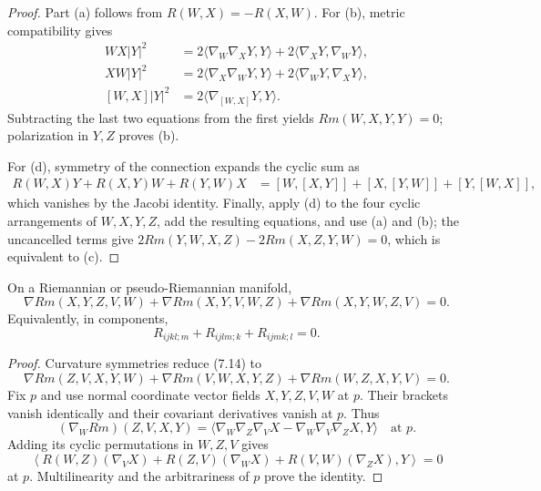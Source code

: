 \begin{proof}
\sketch Part (a) follows from $R(W,X)=-R(X,W)$. For (b), metric
compatibility gives
\begin{align*}
WX|Y|^2&=2\langle\nabla_W\nabla_XY,Y\rangle
 +2\langle\nabla_XY,\nabla_WY\rangle,\\
XW|Y|^2&=2\langle\nabla_X\nabla_WY,Y\rangle
 +2\langle\nabla_WY,\nabla_XY\rangle,\\
[W,X]|Y|^2&=2\langle\nabla_{[W,X]}Y,Y\rangle.
\end{align*}
Subtracting the last two equations from the first yields
$Rm(W,X,Y,Y)=0$; polarization in $Y,Z$ proves (b).

For (d), symmetry of the connection expands the cyclic sum as
\begin{align*}
R(W,X)Y+R(X,Y)W+R(Y,W)X
&=[W,[X,Y]]+[X,[Y,W]]+[Y,[W,X]],
\end{align*}
which vanishes by the Jacobi identity. Finally, apply (d) to the four cyclic
arrangements of $W,X,Y,Z$, add the resulting equations, and use (a) and (b);
the uncancelled terms give
$2Rm(Y,W,X,Z)-2Rm(X,Z,Y,W)=0$, which is equivalent to (c).
\end{proof}

\begin{proposition}
\label{prop:differential-bianchi-identity}


On a Riemannian or pseudo-Riemannian manifold,
\begin{equation}
\nabla Rm(X,Y,Z,V,W)+\nabla Rm(X,Y,V,W,Z)
+\nabla Rm(X,Y,W,Z,V)=0.
\tag{7.14}
\end{equation}
Equivalently, in components,
\begin{equation}
R_{ijkl;m}+R_{ijlm;k}+R_{ijmk;l}=0.
\tag{7.15}
\end{equation}
\end{proposition}

\begin{proof}
\sketch Curvature symmetries reduce (7.14) to
\begin{equation}
\nabla Rm(Z,V,X,Y,W)+\nabla Rm(V,W,X,Y,Z)
+\nabla Rm(W,Z,X,Y,V)=0.
\tag{7.16}
\end{equation}
Fix $p$ and use normal coordinate vector fields $X,Y,Z,V,W$ at $p$. Their
brackets vanish identically and their covariant derivatives vanish at $p$.
Thus
\[
(\nabla_WRm)(Z,V,X,Y)
=\langle\nabla_W\nabla_Z\nabla_VX-\nabla_W\nabla_V\nabla_ZX,Y\rangle
\quad\text{at }p.
\]
Adding its cyclic permutations in $W,Z,V$ gives
\[
\left\langle
R(W,Z)(\nabla_VX)+R(Z,V)(\nabla_WX)+R(V,W)(\nabla_ZX),Y
\right\rangle=0
\]
at $p$. Multilinearity and the arbitrariness of $p$ prove the identity.
\end{proof}

